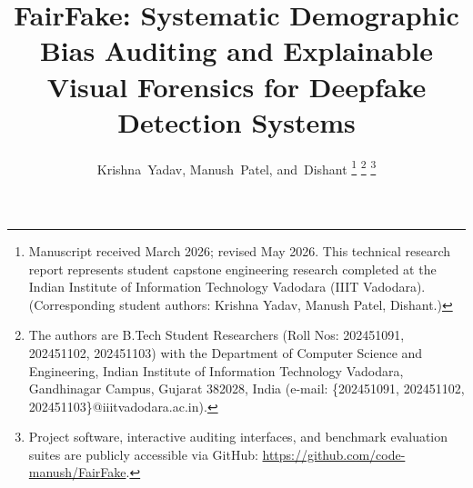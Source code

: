 \documentclass[journal]{IEEEtran}
\begin{document}
\title{FairFake: Systematic Demographic Bias Auditing and Explainable Visual Forensics for Deepfake Detection Systems}

\author{Krishna~Yadav,
        Manush~Patel,
        and~Dishant%
\thanks{Manuscript received March 2026; revised May 2026. This technical research report represents student capstone engineering research completed at the Indian Institute of Information Technology Vadodara (IIIT Vadodara). (Corresponding student authors: Krishna Yadav, Manush Patel, Dishant.)}%
\thanks{The authors are B.Tech Student Researchers (Roll Nos: 202451091, 202451102, 202451103) with the Department of Computer Science and Engineering, Indian Institute of Information Technology Vadodara, Gandhinagar Campus, Gujarat 382028, India (e-mail: \{202451091, 202451102, 202451103\}@iiitvadodara.ac.in).}%
\thanks{Project software, interactive auditing interfaces, and benchmark evaluation suites are publicly accessible via GitHub: \url{https://github.com/code-manush/FairFake}.}%
}

\maketitle
\end{document}
